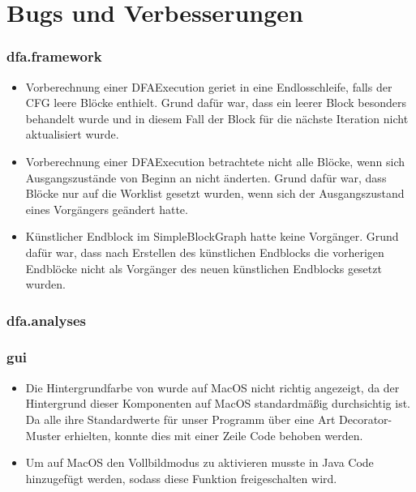 \part{Bugs und Verbesserungen}

\section{dfa.framework}

\begin{itemize}
	\item Vorberechnung einer DFAExecution geriet in eine Endlosschleife, falls der CFG leere Blöcke enthielt.
	Grund dafür war, dass ein leerer Block besonders behandelt wurde und in diesem Fall der Block für die nächste Iteration nicht aktualisiert wurde.
	\item Vorberechnung einer DFAExecution betrachtete nicht alle Blöcke, wenn sich Ausgangszustände von Beginn an nicht änderten. Grund dafür war, dass Blöcke nur auf die Worklist gesetzt wurden, wenn sich der Ausgangszustand eines Vorgängers geändert hatte. 
	\item Künstlicher Endblock im SimpleBlockGraph hatte keine Vorgänger. Grund dafür war, dass nach Erstellen des künstlichen Endblocks die vorherigen Endblöcke nicht als Vorgänger des neuen künstlichen Endblocks gesetzt wurden.
\end{itemize}

\section{dfa.analyses}


\section{gui}

\begin{itemize}
	\item Die Hintergrundfarbe von  wurde auf MacOS nicht richtig angezeigt, da der Hintergrund dieser Komponenten auf MacOS standardmäßig durchsichtig ist. 
	Da alle  ihre Standardwerte für unser Programm über eine Art Decorator-Muster erhielten, konnte dies mit einer Zeile Code behoben werden.  
	\item Um auf MacOS den Vollbildmodus zu aktivieren musste in Java Code hinzugefügt werden, sodass diese Funktion freigeschalten wird.
\end{itemize}


